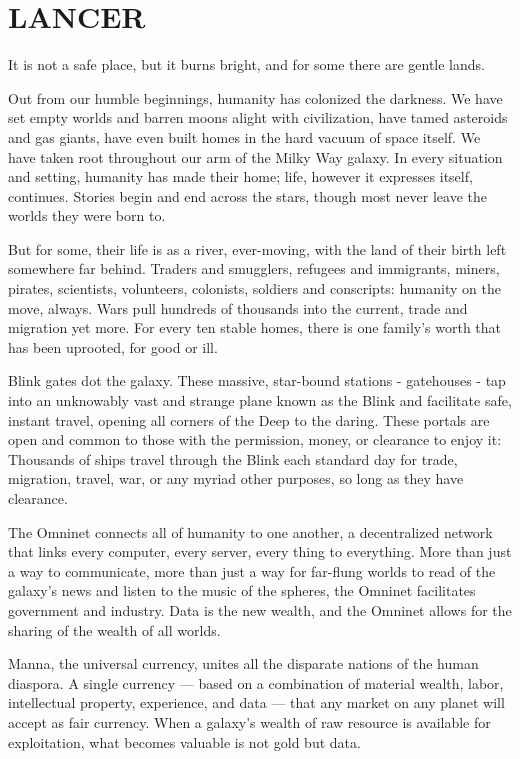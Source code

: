 \chapter{LANCER}
 It is not a safe place,
but it burns bright, and for some there are gentle lands.

Out from our humble beginnings, humanity has colonized the darkness. We have set empty
worlds and barren moons alight with civilization, have tamed asteroids and gas giants, have even
built homes in the hard vacuum of space itself. We have taken root throughout our arm of the
Milky Way galaxy. In every situation and setting, humanity has made their home; life, however it
expresses itself, continues. Stories begin and end across the stars, though most never leave the
worlds they were born to.

But for some, their life is as a river, ever-moving, with the land of their birth left somewhere far
behind. Traders and smugglers, refugees and immigrants, miners, pirates, scientists, volunteers,
colonists, soldiers and conscripts: humanity on the move, always. Wars pull hundreds of
thousands into the current, trade and migration yet more. For every ten stable homes, there is
one family's worth that has been uprooted, for good or ill.

Blink gates dot the galaxy. These massive, star-bound stations - gatehouses - tap into an
unknowably vast and strange plane known as the Blink and facilitate safe, instant travel, opening
all corners of the Deep to the daring. These portals are open and common to those with the
permission, money, or clearance to enjoy it: Thousands of ships travel through the Blink each
standard day for trade, migration, travel, war, or any myriad other purposes, so long as they have
clearance.

The Omninet connects all of humanity to one another, a decentralized network that links every
computer, every server, every thing to everything. More than just a way to communicate, more
than just a way for far-flung worlds to read of the galaxy's news and listen to the music of the
spheres, the Omninet facilitates government and industry. Data is the new wealth, and the
Omninet allows for the sharing of the wealth of all worlds.

Manna, the universal currency, unites all the disparate nations of the human diaspora. A single
currency — based on a combination of material wealth, labor, intellectual property, experience,
and data — that any market on any planet will accept as fair currency. When a galaxy's wealth of
raw resource is available for exploitation, what becomes valuable is not gold but data.

